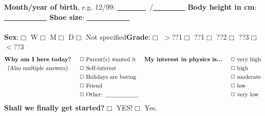 \textbf{Month/year of birth}, \textsf{e.g. 12/99}: \underline{~~~~~~~~}~/\underline{~~~~~~~~~}\hspace{1cm} \textbf{Body height in cm}: \underline{~~~~~~~~~~~~}\hspace{1cm} \textbf{Shoe size}: \underline{~~~~~~~~~~~~} \\ 
\vspace{0.2cm}\\
\textbf{Sex}:\hspace{0.4cm}$\Box$ W\hspace{0.5cm}$\Box$ M\hspace{0.5cm}$\Box$ D\hspace{0.5cm}$\Box$ Not specified\hspace{1cm}\textbf{Grade}:\hspace{0.5cm}$\Box$ $>$??1\hspace{0.5cm}$\Box$ ??1\hspace{0.5cm}$\Box$ ??2\hspace{0.5cm}$\Box$ ??3\hspace{0.5cm}$\Box$ $<$??3 \\
\begin{align*}
\textmd{\textbf{Why am I here today?}}   \hspace{0.5cm}& \Box \textmd{ Parent(s) wanted it} &\textmd{\textbf{My interest in physics is...}}  \hspace{0.5cm}& \Box \textmd{ very high}\\
\textmd{(Also multiple answers)}   \hspace{0.7cm}&\Box \textmd{ Self-interest} && \Box \textmd{ high}\\
    &\Box \textmd{ Holidays are boring} && \Box \textmd{ moderate}\\
    &\Box \textmd{ Friend} && \Box \textmd{ low}\\
    &\Box \textmd{ Other: \underline{\hspace{2cm}}} && \Box \textmd{ very low}
\end{align*}
\textbf{Shall we finally get started?}\hspace{0.5cm}$\Box$ YES!\hspace{0.5cm}$\Box$ Yes. \newline

